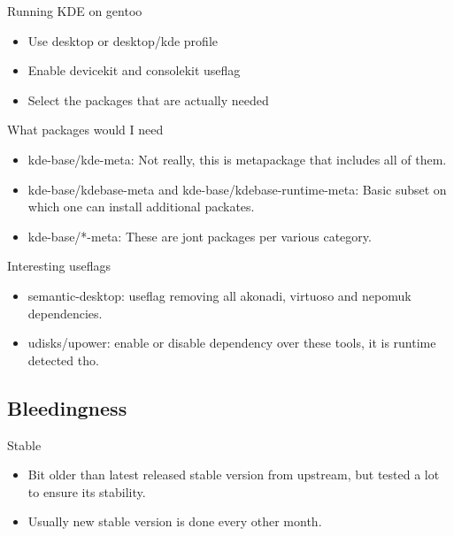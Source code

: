 \documentclass{beamer}
\begin{document}
\begin{frame}{Running KDE on gentoo}
	\begin{itemize}
		\item Use desktop or desktop/kde profile
		\item Enable devicekit and consolekit useflag
		\item Select the packages that are actually needed
	\end{itemize}
\end{frame}

\begin{frame}{What packages would I need}
	\begin{itemize}
		\item kde-base/kde-meta: Not really, this is metapackage that includes all of them.
		\item kde-base/kdebase-meta and kde-base/kdebase-runtime-meta: Basic subset on which one can install additional packates.
		\item kde-base/*-meta: These are jont packages per various category.
	\end{itemize}
\end{frame}

\begin{frame}{Interesting useflags}
	\begin{itemize}
		\item semantic-desktop: useflag removing all akonadi, virtuoso and nepomuk dependencies.
		\item udisks/upower: enable or disable dependency over these tools, it is runtime detected tho.
	\end{itemize}
\end{frame}

\subsection{Bleedingness}
\begin{frame}{Stable}
	\begin{itemize}
		\item Bit older than latest released stable version from upstream, but tested a lot to ensure its stability.
		\item Usually new stable version is done every other month.
	\end{itemize}
\end{frame}
\end{document}
